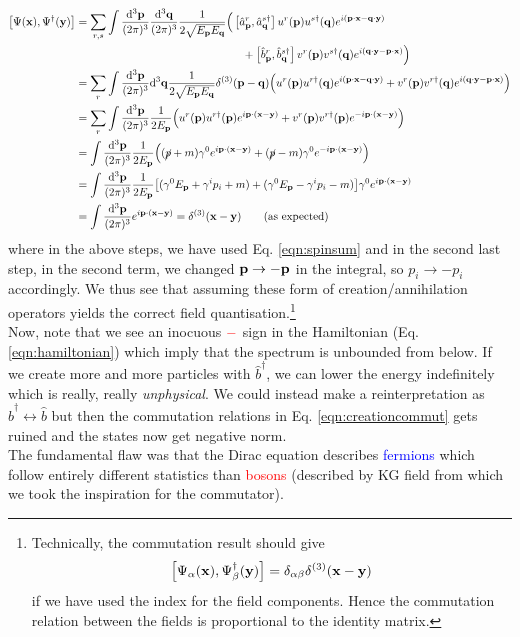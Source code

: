 \begin{align*}
   \left[ \Psi(\vb{x}), \Psi^\dagger(\vb{y}) \right]&= \sum\limits_{r,s} \int \frac{\dd^3\vb{{\vb{p}}}}{(2\pi)^3}\frac{\dd^3\vb{{\vb{q}}}}{(2\pi)^3} \frac{1}{2\sqrt{E_{\vb{p}}E_{\vb{q}}}}\Big( \left[ {\hat{a}_{\vb{p}}}^{r}, {\hat{a}_{\vb{q}}}^{s\dagger} \right]u^r(\vb{p})u^{s\dagger}(\vb{q})e^{i(\vb{p}\cdot \vb{x} - \vb{q}\cdot \vb{y})}\\ &\qquad \qquad\qquad\qquad\quad \qquad\qquad \qquad + \left[ {\hat{b}_{\vb{p}}}^{r}, {\hat{b}_{\vb{q}}}^{s\dagger} \right]v^r(\vb{p})v^{s\dagger}(\vb{q})e^{i(\vb{q}\cdot \vb{y} - \vb{p}\cdot \vb{x})} \Big)\\
   &=\sum\limits_{r}\int \frac{\dd^3\vb{{\vb{p}}}}{(2\pi)^3} \dd^3 \vb{q} \frac{1}{2\sqrt{E_{\vb{p}}E_{\vb{q}}}}\delta^{(3)}(\vb{p} - \vb{q})\Big(u^r(\vb{p})u^{r\dagger}(\vb{q})e^{i(\vb{p}\cdot \vb{x} - \vb{q}\cdot \vb{y})} + v^r(\vb{p})v^{r\dagger}(\vb{q})e^{i(\vb{q}\cdot \vb{y} - \vb{p}\cdot \vb{x})} \Big)\\
   &=\sum\limits_{r}\int \frac{\dd^3\vb{{\vb{p}}}}{(2\pi)^3}  \frac{1}{2E_{\vb{p}}}\Big(u^r(\vb{p})u^{r\dagger}(\vb{p})e^{i\vb{p}\cdot (\vb{x}-\vb{y})} + v^r(\vb{p})v^{r\dagger}(\vb{p})e^{-i\vb{p}\cdot(\vb{x}-\vb{y})} \Big)\\
   &=\int \frac{\dd^3\vb{{\vb{p}}}}{(2\pi)^3}  \frac{1}{2E_{\vb{p}}}\Big( (\cancel{p}+m)\gamma^0 e^{i\vb{p}\cdot (\vb{x}-\vb{y})} + (\cancel{p} -m)\gamma^0e^{-i\vb{p}\cdot(\vb{x}-\vb{y})} \Big)\\
   &=\int \frac{\dd^3\vb{{\vb{p}}}}{(2\pi)^3}  \frac{1}{2E_{\vb{p}}}\qty[(\gamma^0 E_{\vb{p}} + \gamma^i p_i + m) + (\gamma^0 E_{\vb{p}} - \gamma^i p_i -m)]\gamma^0 e^{i\vb{p}\cdot (\vb{x}-\vb{y})}\\
   &=\int \frac{\dd^3\vb{{\vb{p}}}}{(2\pi)^3}  e^{i\vb{p}\cdot (\vb{x}-\vb{y})} = \delta^{(3)}(\vb{x}-\vb{y}) \qquad (\text{as expected})
\end{align*}
where in the above steps, we have used Eq. \ref{eqn:spinsum} and in the second last step, in the second term, we changed $\vb{p}\to -\vb{p}$ in the integral, so $p_i \to -p_i$ accordingly. We thus see that assuming these form of creation/annihilation operators yields the correct field quantisation.\footnote{Technically, the commutation result should give $$\left[ \Psi_\alpha(\vb{x}), \Psi_\beta^\dagger(\vb{y}) \right] =\delta_{\alpha \beta} \delta^{(3)}(\vb{x}-\vb{y})$$ if we have used the index for the field components. Hence the commutation relation between the fields is proportional to the identity matrix.} \\[0.2cm]
Now, note that we see an inocuous $\mathcolor{red}{-}$ sign in the Hamiltonian (Eq. \ref{eqn:hamiltonian}) which imply that the spectrum is unbounded from below. If we create more and more particles with $\hat{b}^\dagger$, we can lower the energy indefinitely which is really, really \textit{unphysical}. We could instead make a reinterpretation as $\hat{b}^\dagger \leftrightarrow \hat{b}$ but then the commutation relations in Eq. \ref{eqn:creationcommut} gets ruined and the states now get negative norm. \\[0.2cm]
The fundamental flaw was that the Dirac equation describes \textcolor{blue}{fermions} which follow entirely different statistics than \textcolor{red}{bosons} (described by KG field from which we took the inspiration for the commutator).